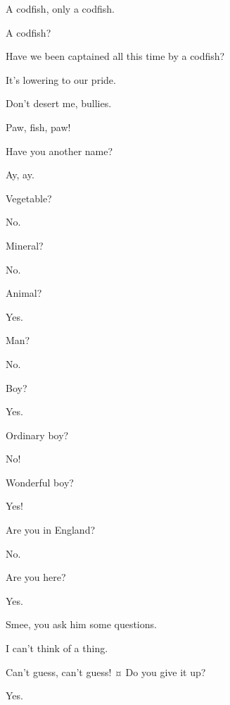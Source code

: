 \begin{drama}
\peterspeaks
A codfish, only a codfish.

A codfish?

Have we been captained all this time by a codfish?

\starkeyspeaks
It’s lowering to our pride.

Don’t desert me, bullies.

Paw, fish, paw!


\hookspeaks
Have you another name?

Ay, ay.

Vegetable?

\peterspeaks
No.

\hookspeaks
Mineral?

\peterspeaks
No.

\hookspeaks
Animal?

Yes.

\hookspeaks
Man?

No.

\hookspeaks
Boy?

\peterspeaks
Yes.

\hookspeaks
Ordinary boy?

\peterspeaks
No!

\hookspeaks
Wonderful boy?

Yes!

\hookspeaks
Are you in England?

\peterspeaks
No.

\hookspeaks
Are you here?

\peterspeaks
Yes.

Smee, you ask him some questions.

I can’t think of a thing.

\peterspeaks
Can’t guess, can’t guess!
¤
Do you give it up?

Yes.


\end{drama}

